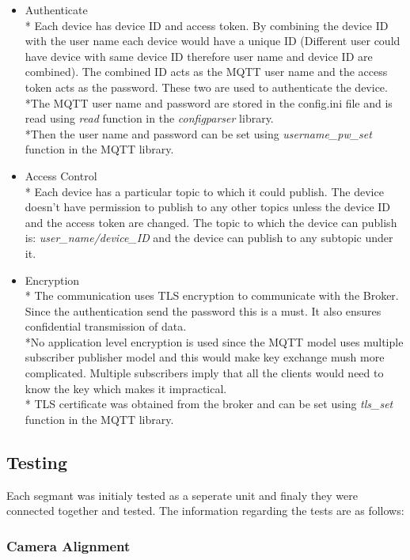 \documentclass{report}
\begin{document}
\begin{itemize}     
    \item Authenticate\\* Each device has device ID and access token. By combining the device ID with the user name each device would have a unique ID (Different user could have device with same device ID therefore user name and device ID are combined). The combined ID acts as the MQTT user name and the access token acts as the password. These two are used to authenticate the device. \\*The MQTT user name and password are stored in the config.ini file and is read using \textit{read} function in the \textit{configparser} library. \\*Then the user name and password can be set using \textit{username\_pw\_set} function in the MQTT library.
    \item Access Control\\* Each device has a particular topic to which it could publish. The device doesn't have permission to publish to any other topics unless the device ID and the access token are changed. The topic to which the device can publish is: \textit{user\_name/device\_ID} and the device can publish to any subtopic under it.
    \item Encryption\\* The communication uses TLS encryption to communicate with the Broker. Since the authentication send the password this is a must. It also ensures confidential transmission of data.\\*No application level encryption is used since the MQTT model uses multiple subscriber publisher model and this would make key exchange mush more complicated. Multiple subscribers imply that all the clients would need to know the key which makes it impractical.\\* TLS certificate was obtained from the broker and can be set using \textit{tls\_set} function in the MQTT library.
\end{itemize}

\subsection{Testing} %

Each segmant was initialy tested as a seperate unit and finaly they were connected together and tested. The information regarding the tests are as follows:

\subsubsection{Camera Alignment}
\end{document}
